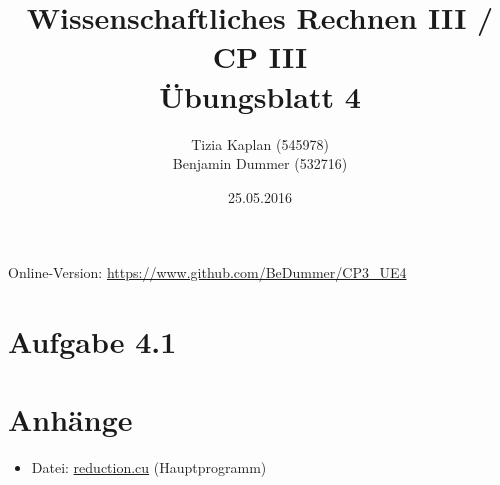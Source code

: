 \documentclass[%
	paper=A4,	%
	pagesize,	%
	DIV=calc,	%
	smallheadings,	%
	ngerman		%
]{scrartcl}
\title{{\bf Wissenschaftliches Rechnen III / CP III}\\Übungsblatt 4}
\author{Tizia Kaplan (545978)\\Benjamin Dummer (532716)}
\date{25.05.2016}
\begin{document}
\maketitle
Online-Version: \href{https://www.github.com/BeDummer/CP3_UE4}{\url{https://www.github.com/BeDummer/CP3_UE4}}

\section*{Aufgabe 4.1}


\section*{Anhänge}
\begin{itemize}
	\item Datei: \url{reduction.cu} (Hauptprogramm)
\end{itemize}
\end{document}
